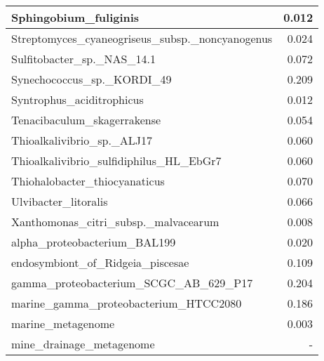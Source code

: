 \documentclass[12pt,a4paper]{article}
\begin{document}
\begin{table}[ht]
\begin{center}
\begin{tabular}{|l*{1}{|r}|}
Sphingobium\_fuliginis & 0.012 \\ \hline
Streptomyces\_cyaneogriseus\_subsp.\_noncyanogenus & 0.024 \\ \hline
Sulfitobacter\_sp.\_NAS\_14.1 & 0.072 \\ \hline
Synechococcus\_sp.\_KORDI\_49 & 0.209 \\ \hline
Syntrophus\_aciditrophicus & 0.012 \\ \hline
Tenacibaculum\_skagerrakense & 0.054 \\ \hline
Thioalkalivibrio\_sp.\_ALJ17 & 0.060 \\ \hline
Thioalkalivibrio\_sulfidiphilus\_HL\_EbGr7 & 0.060 \\ \hline
Thiohalobacter\_thiocyanaticus & 0.070 \\ \hline
Ulvibacter\_litoralis & 0.066 \\ \hline
Xanthomonas\_citri\_subsp.\_malvacearum & 0.008 \\ \hline
alpha\_proteobacterium\_BAL199 & 0.020 \\ \hline
endosymbiont\_of\_Ridgeia\_piscesae & 0.109 \\ \hline
gamma\_proteobacterium\_SCGC\_AB\_629\_P17 & 0.204 \\ \hline
marine\_gamma\_proteobacterium\_HTCC2080 & 0.186 \\ \hline
marine\_metagenome & 0.003 \\ \hline
mine\_drainage\_metagenome & - \\ \hline
\end{tabular}
\end{center}
\end{table}
\end{document}
